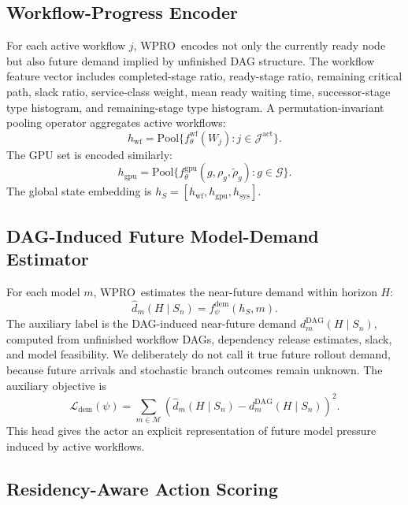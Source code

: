 \documentclass[10pt,conference]{IEEEtran}
\newcommand{\WPRO}{\textsc{WPRO}}
\newcommand{\calJ}{\mathcal{J}}
\newcommand{\calM}{\mathcal{M}}
\newcommand{\calG}{\mathcal{G}}
\begin{document}
\subsection{Workflow-Progress Encoder}

For each active workflow \(j\), \WPRO\ encodes not only the currently ready node but also future demand implied by unfinished DAG structure. The workflow feature vector includes completed-stage ratio, ready-stage ratio, remaining critical path, slack ratio, service-class weight, mean ready waiting time, successor-stage type histogram, and remaining-stage type histogram. A permutation-invariant pooling operator aggregates active workflows:
\begin{equation}
h_{\mathrm{wf}}=\mathrm{Pool}\{f_{\theta}^{\mathrm{wf}}(W_j):j\in\calJ^{\mathrm{act}}\}.
\end{equation}
The GPU set is encoded similarly:
\begin{equation}
h_{\mathrm{gpu}}=\mathrm{Pool}\{f_{\theta}^{\mathrm{gpu}}(g,\rho_g,\tilde{\rho}_g):g\in\calG\}.
\end{equation}
The global state embedding is \(h_S=[h_{\mathrm{wf}},h_{\mathrm{gpu}},h_{\mathrm{sys}}]\).

\subsection{DAG-Induced Future Model-Demand Estimator}

For each model \(m\), \WPRO\ estimates the near-future demand within horizon \(H\):
\begin{equation}
\hat d_m(H\mid S_n)=f_{\psi}^{\mathrm{dem}}(h_S,m).
\end{equation}
The auxiliary label is the DAG-induced near-future demand \(d_m^{\mathrm{DAG}}(H\mid S_n)\), computed from unfinished workflow DAGs, dependency release estimates, slack, and model feasibility. We deliberately do not call it true future rollout demand, because future arrivals and stochastic branch outcomes remain unknown. The auxiliary objective is
\begin{equation}
\mathcal{L}_{\mathrm{dem}}(\psi)=
\sum_{m\in\calM}
\left(\hat d_m(H\mid S_n)-d_m^{\mathrm{DAG}}(H\mid S_n)\right)^2.
\end{equation}
This head gives the actor an explicit representation of future model pressure induced by active workflows.

\subsection{Residency-Aware Action Scoring}
\end{document}
